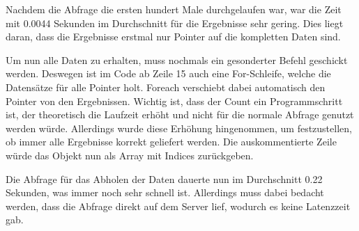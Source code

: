 Nachdem die Abfrage die ersten hundert Male durchgelaufen war, war die Zeit mit 0.0044 Sekunden im Durchschnitt für die Ergebnisse sehr gering. Dies liegt daran, dass die Ergebnisse erstmal nur Pointer auf die kompletten Daten sind. 

Um nun alle Daten zu erhalten, muss nochmals ein gesonderter Befehl geschickt werden. Deswegen ist im Code ab Zeile 15 auch eine For-Schleife, welche die Datensätze für alle Pointer holt. Foreach verschiebt dabei automatisch den Pointer von den Ergebnissen. Wichtig ist, dass der Count ein Programmschritt ist, der theoretisch die Laufzeit erhöht und nicht für die normale Abfrage genutzt werden würde. Allerdings wurde diese Erhöhung hingenommen, um festzustellen, ob immer alle Ergebnisse korrekt geliefert werden.
Die auskommentierte Zeile würde das Objekt nun als Array mit Indices zurückgeben. 

Die Abfrage für das Abholen der Daten dauerte nun im Durchschnitt 0.22 Sekunden, was immer noch sehr schnell ist. Allerdings muss dabei bedacht werden, dass die Abfrage direkt auf dem Server lief, wodurch es keine Latenzzeit gab.
